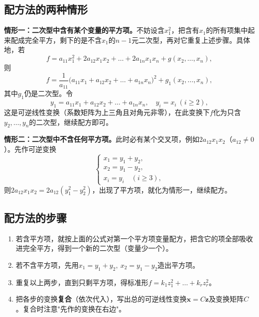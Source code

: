 \subsection{配方法的两种情形}
\textbf{情形一：二次型中含有某个变量的平方项。}\quad 不妨设含$x_1^{2}$，把含有$x_1$的所有项集中起来配成完全平方，剩下的是不含$x_1$的$n-1$元二次型，再对它重复上述步骤。具体地，若
\[
f=a_{11}x_1^{2}+2a_{12}x_1x_2+\dots+2a_{1n}x_1x_n+g(x_2,\dots,x_n),
\]
则
\[
f=\frac{1}{a_{11}}\bigl(a_{11}x_1+a_{12}x_2+\dots+a_{1n}x_n\bigr)^{2}
+g_1(x_2,\dots,x_n),
\]
其中$g_1$仍是二次型。令
\[
y_1=a_{11}x_1+a_{12}x_2+\dots+a_{1n}x_n,\quad y_i=x_i\ (i\ge2),
\]
这是可逆线性变换（系数矩阵为上三角且对角元非零），在此变换下$f$化为只含$y_2,\dots,y_n$的二次型，继续配方即可。

\textbf{情形二：二次型中不含任何平方项。}\quad 此时必有某个交叉项，例如$2a_{12}x_1x_2$（$a_{12}\ne0$）。先作可逆变换
\[
\begin{cases}
x_1=y_1+y_2,\\
x_2=y_1-y_2,\\
x_i=y_i\quad(i\ge3),
\end{cases}
\]
则$2a_{12}x_1x_2=2a_{12}(y_1^{2}-y_2^{2})$，出现了平方项，就化为情形一，继续配方。

\subsection{配方法的步骤}
\begin{enumerate}
    \item 若含平方项，就按上面的公式对第一个平方项变量配方，把含它的项全部吸收进完全平方，得到一个新的二次型（变量少一个）。
    \item 若不含平方项，先用$x_1=y_1+y_2,\ x_2=y_1-y_2$造出平方项。
    \item 重复以上两步，直到只剩平方项，得标准形$f=k_1z_1^{2}+\dots+k_rz_r^{2}$。
    \item 把各步的变换\textbf{复合}（依次代入），写出总的可逆线性变换$\boldsymbol{x}=C\boldsymbol{z}$及变换矩阵$C$。复合时注意"先作的变换在右边"。
\end{enumerate}


